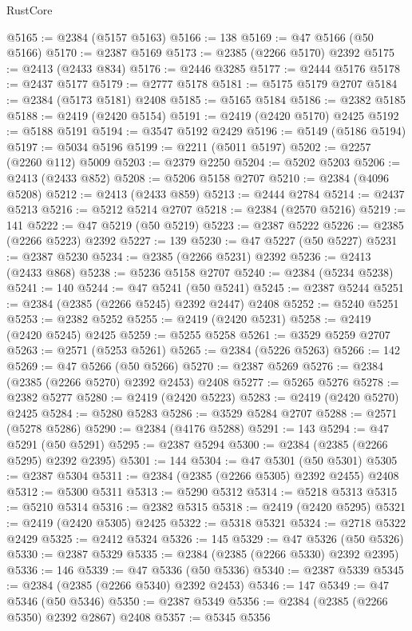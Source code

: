 \begin{lexlean}{RustCore}
\begin{coremodule}
@5165 := @2384 (@5157 @5163)
@5166 := 138
@5169 := @47 @5166 (@50 @5166)
@5170 := @2387 @5169
@5173 := @2385 (@2266 @5170) @2392
@5175 := @2413 (@2433 @834)
@5176 := @2446 @3285
@5177 := @2444 @5176
@5178 := @2437 @5177
@5179 := @2777 @5178
@5181 := @5175 @5179 @2707
@5184 := @2384 (@5173 @5181) @2408
@5185 := @5165 @5184
@5186 := @2382 @5185
@5188 := @2419 (@2420 @5154)
@5191 := @2419 (@2420 @5170) @2425
@5192 := @5188 @5191
@5194 := @3547 @5192 @2429
@5196 := @5149 (@5186 @5194)
@5197 := @5034 @5196
@5199 := @2211 (@5011 @5197)
@5202 := @2257 (@2260 @112) @5009
@5203 := @2379 @2250
@5204 := @5202 @5203
@5206 := @2413 (@2433 @852)
@5208 := @5206 @5158 @2707
@5210 := @2384 (@4096 @5208)
@5212 := @2413 (@2433 @859)
@5213 := @2444 @2784
@5214 := @2437 @5213
@5216 := @5212 @5214 @2707
@5218 := @2384 (@2570 @5216)
@5219 := 141
@5222 := @47 @5219 (@50 @5219)
@5223 := @2387 @5222
@5226 := @2385 (@2266 @5223) @2392
@5227 := 139
@5230 := @47 @5227 (@50 @5227)
@5231 := @2387 @5230
@5234 := @2385 (@2266 @5231) @2392
@5236 := @2413 (@2433 @868)
@5238 := @5236 @5158 @2707
@5240 := @2384 (@5234 @5238)
@5241 := 140
@5244 := @47 @5241 (@50 @5241)
@5245 := @2387 @5244
@5251 := @2384 (@2385 (@2266 @5245) @2392 @2447) @2408
@5252 := @5240 @5251
@5253 := @2382 @5252
@5255 := @2419 (@2420 @5231)
@5258 := @2419 (@2420 @5245) @2425
@5259 := @5255 @5258
@5261 := @3529 @5259 @2707
@5263 := @2571 (@5253 @5261)
@5265 := @2384 (@5226 @5263)
@5266 := 142
@5269 := @47 @5266 (@50 @5266)
@5270 := @2387 @5269
@5276 := @2384 (@2385 (@2266 @5270) @2392 @2453) @2408
@5277 := @5265 @5276
@5278 := @2382 @5277
@5280 := @2419 (@2420 @5223)
@5283 := @2419 (@2420 @5270) @2425
@5284 := @5280 @5283
@5286 := @3529 @5284 @2707
@5288 := @2571 (@5278 @5286)
@5290 := @2384 (@4176 @5288)
@5291 := 143
@5294 := @47 @5291 (@50 @5291)
@5295 := @2387 @5294
@5300 := @2384 (@2385 (@2266 @5295) @2392 @2395)
@5301 := 144
@5304 := @47 @5301 (@50 @5301)
@5305 := @2387 @5304
@5311 := @2384 (@2385 (@2266 @5305) @2392 @2455) @2408
@5312 := @5300 @5311
@5313 := @5290 @5312
@5314 := @5218 @5313
@5315 := @5210 @5314
@5316 := @2382 @5315
@5318 := @2419 (@2420 @5295)
@5321 := @2419 (@2420 @5305) @2425
@5322 := @5318 @5321
@5324 := @2718 @5322 @2429
@5325 := @2412 @5324
@5326 := 145
@5329 := @47 @5326 (@50 @5326)
@5330 := @2387 @5329
@5335 := @2384 (@2385 (@2266 @5330) @2392 @2395)
@5336 := 146
@5339 := @47 @5336 (@50 @5336)
@5340 := @2387 @5339
@5345 := @2384 (@2385 (@2266 @5340) @2392 @2453)
@5346 := 147
@5349 := @47 @5346 (@50 @5346)
@5350 := @2387 @5349
@5356 := @2384 (@2385 (@2266 @5350) @2392 @2867) @2408
@5357 := @5345 @5356

\end{coremodule}
\end{lexlean}
